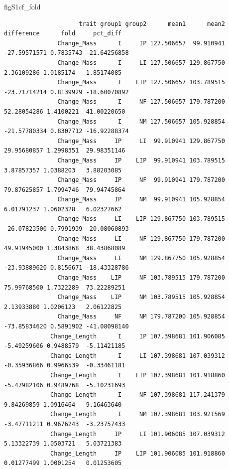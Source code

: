 \documentclass[
  landscape]{article}
\newenvironment{Shaded}{\begin{snugshade}}{\end{snugshade}}
\newcommand{\NormalTok}[1]{#1}
\begin{document}
\begin{Shaded}
\begin{Highlighting}[]
\NormalTok{figS1cf\_fold}
\end{Highlighting}
\end{Shaded}

\begin{verbatim}
                     trait group1 group2      mean1      mean2   difference      fold     pct_diff
               Change_Mass      I     IP 127.506657  99.910941 -27.59571571 0.7835743 -21.64256858
               Change_Mass      I     LI 127.506657 129.867750   2.36109286 1.0185174   1.85174085
               Change_Mass      I    LIP 127.506657 103.789515 -23.71714214 0.8139929 -18.60070892
               Change_Mass      I     NF 127.506657 179.787200  52.28054286 1.4100221  41.00220650
               Change_Mass      I     NM 127.506657 105.928854 -21.57780334 0.8307712 -16.92288374
               Change_Mass     IP     LI  99.910941 129.867750  29.95680857 1.2998351  29.98351146
               Change_Mass     IP    LIP  99.910941 103.789515   3.87857357 1.0388203   3.88203085
               Change_Mass     IP     NF  99.910941 179.787200  79.87625857 1.7994746  79.94745864
               Change_Mass     IP     NM  99.910941 105.928854   6.01791237 1.0602328   6.02327662
               Change_Mass     LI    LIP 129.867750 103.789515 -26.07823500 0.7991939 -20.08060893
               Change_Mass     LI     NF 129.867750 179.787200  49.91945000 1.3843868  38.43868089
               Change_Mass     LI     NM 129.867750 105.928854 -23.93889620 0.8156671 -18.43328786
               Change_Mass    LIP     NF 103.789515 179.787200  75.99768500 1.7322289  73.22289251
               Change_Mass    LIP     NM 103.789515 105.928854   2.13933880 1.0206123   2.06122825
               Change_Mass     NF     NM 179.787200 105.928854 -73.85834620 0.5891902 -41.08098140
             Change_Length      I     IP 107.398681 101.906085  -5.49259606 0.9488579  -5.11421185
             Change_Length      I     LI 107.398681 107.039312  -0.35936866 0.9966539  -0.33461181
             Change_Length      I    LIP 107.398681 101.918860  -5.47982106 0.9489768  -5.10231693
             Change_Length      I     NF 107.398681 117.241379   9.84269859 1.0916464   9.16463640
             Change_Length      I     NM 107.398681 103.921569  -3.47711211 0.9676243  -3.23757433
             Change_Length     IP     LI 101.906085 107.039312   5.13322739 1.0503721   5.03721383
             Change_Length     IP    LIP 101.906085 101.918860   0.01277499 1.0001254   0.01253605

\end{verbatim}
\end{document}

